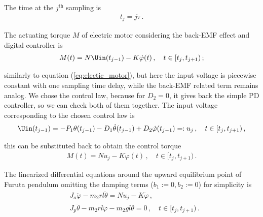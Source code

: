 \noindent The time at the $j^\mathrm{th}$ sampling is \begin{align}
	t_j = j\tau\,. 
\end{align}

\noindent
The actuating torque $M$ of electric motor considering the back-EMF effect and digital controller is  
\begin{align}
	M(t) = N\Uin(t_{j-1})-K\dot{\varphi}(t)\,,\quad t\in[t_{j},t_{j+1})\,;
\end{align}

\noindent similarly to equation (\ref{eq:electic_motor}), but here the input voltage is piecewise constant with one sampling time delay, while the back-EMF related term remains analog.
We chose the \PDD{} control law, because for $D_2=0$, it gives back the simple PD controller, so we can check both of them together.
The input voltage corresponding to the chosen \PDD{} control law is
\begin{align}
	\Uin(t_{j-1}) = -P_1\theta(t_{j-1})-D_1\dot \theta(t_{j-1}) + D_2 \dot \varphi (t_{j-1}) =: u_j\,, \quad t\in[t_{j},t_{j+1})\,, 
	\label{eq:digital_conrol_law_PDD} 
\end{align}

\noindent this can be substituted back to obtain the control torque
\begin{align}
	M(t) = Nu_j -K\dot{\varphi}(t)\,,\quad t\in[t_{j},t_{j+1})\,.
\end{align}

The linearized differential equations around the upward equilibrium point of Furuta pendulum omitting the damping terms ($b_1:=0, b_2:=0$) for simplicity is 
\begin{subequations}
	\begin{align}
		&J_a \ddot\varphi 
		- m_2 r l  \ddot\theta  
		= Nu_j -K\dot{\varphi}\,,
		\\[1ex]
		& J_p \ddot\theta 
		- m_2rl \ddot \varphi
		- m_2gl \theta 
		= 0\,,\quad t\in[t_{j},t_{j+1})\,.
	\end{align}
\end{subequations}

